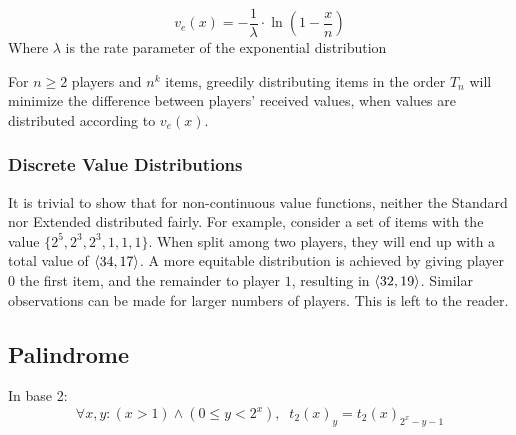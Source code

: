 \documentclass[conference]{IEEEtran}
\begin{document}
\begin{equation}
    v_e(x) = -\dfrac{1}{\lambda} \cdot \ln\left(1 - \dfrac{x}{n}\right)
\end{equation}
Where $\lambda$ is the rate parameter of the exponential distribution

\begin{conjecture}
\label{conj:equit_dist_exponential}
For $n \ge 2$ players and $n^k$ items, greedily distributing items in the order $T_n$ will minimize the difference between players' received values, when values are distributed according to $v_e(x)$.
\end{conjecture}

\subsubsection{Discrete Value Distributions}

It is trivial to show that for non-continuous value functions, neither the Standard nor Extended \TMS distributed fairly. For example, consider a set of items with the value $\{2^5, 2^3, 2^3, 1, 1, 1\}$. When split among two players, they will end up with a total value of $\langle 34, 17 \rangle$. A more equitable distribution is achieved by giving player $0$ the first item, and the remainder to player $1$, resulting in $\langle 32, 19 \rangle$. Similar observations can be made for larger numbers of players. This is left to the reader.

\subsection{Palindrome}

In base 2: \begin{equation}
    \forall x, y : (x > 1) \land (0 \le y < 2^x), \;\; t_2(x)_y = t_2(x)_{2^x - y - 1}
\end{equation}
\end{document}
